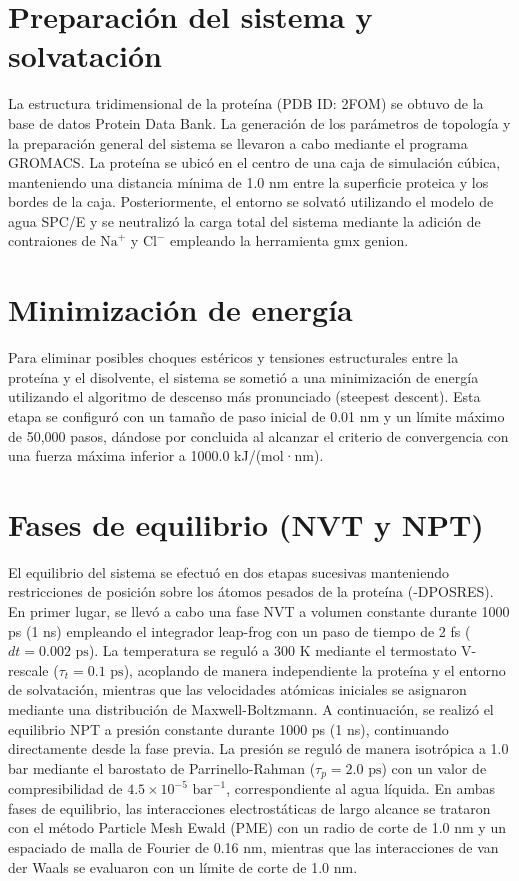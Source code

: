 \section{Preparación del sistema y solvatación}

La estructura tridimensional de la proteína (PDB ID: 2FOM) se obtuvo de la base de datos Protein Data Bank. La generación de los parámetros de topología y la preparación general del sistema se llevaron a cabo mediante el programa GROMACS. La proteína se ubicó en el centro de una caja de simulación cúbica, manteniendo una distancia mínima de 1.0 nm entre la superficie proteica y los bordes de la caja. Posteriormente, el entorno se solvató utilizando el modelo de agua SPC/E y se neutralizó la carga total del sistema mediante la adición de contraiones de $\text{Na}^+$ y $\text{Cl}^-$ empleando la herramienta gmx genion.

\section{Minimización de energía}

Para eliminar posibles choques estéricos y tensiones estructurales entre la proteína y el disolvente, el sistema se sometió a una minimización de energía utilizando el algoritmo de descenso más pronunciado (steepest descent). Esta etapa se configuró con un tamaño de paso inicial de 0.01 nm y un límite máximo de 50,000 pasos, dándose por concluida al alcanzar el criterio de convergencia con una fuerza máxima inferior a 1000.0 kJ/(mol·nm).

\section{Fases de equilibrio (NVT y NPT)}

El equilibrio del sistema se efectuó en dos etapas sucesivas manteniendo restricciones de posición sobre los átomos pesados de la proteína (-DPOSRES). En primer lugar, se llevó a cabo una fase NVT a volumen constante durante 1000 ps (1 ns) empleando el integrador leap-frog con un paso de tiempo de 2 fs ($dt = 0.002\text{ ps}$). La temperatura se reguló a 300 K mediante el termostato V-rescale ($\tau_t = 0.1\text{ ps}$), acoplando de manera independiente la proteína y el entorno de solvatación, mientras que las velocidades atómicas iniciales se asignaron mediante una distribución de Maxwell-Boltzmann.
A continuación, se realizó el equilibrio NPT a presión constante durante 1000 ps (1 ns), continuando directamente desde la fase previa. La presión se reguló de manera isotrópica a 1.0 bar mediante el barostato de Parrinello-Rahman ($\tau_p = 2.0\text{ ps}$) con un valor de compresibilidad de $4.5 \times 10^{-5}\text{ bar}^{-1}$, correspondiente al agua líquida. En ambas fases de equilibrio, las interacciones electrostáticas de largo alcance se trataron con el método Particle Mesh Ewald (PME) con un radio de corte de 1.0 nm y un espaciado de malla de Fourier de 0.16 nm, mientras que las interacciones de van der Waals se evaluaron con un límite de corte de 1.0 nm.

